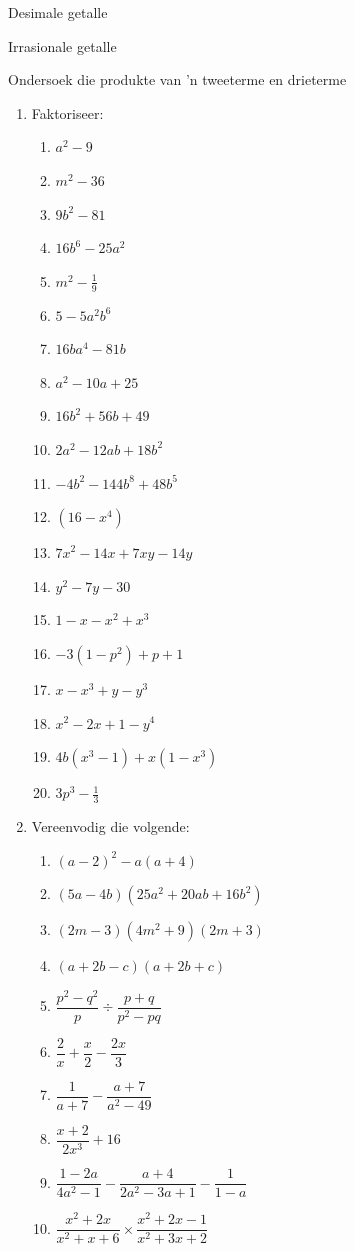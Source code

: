 \begin{Aktiwiteit}{Desimale getalle}
\begin{aktiwiteit}{Irrasionale getalle}
\begin{aktiwiteit}{Ondersoek die produkte van 'n tweeterme en drieterme}
\begin{eocexercises}{}
\begin{enumerate}[itemsep=5pt, label=\textbf{\arabic*}. ]
\item Faktoriseer:
\begin{multicols}{2}
\begin{enumerate}[itemsep=5pt, label=\textbf{\alph*}. ] 
\item ${a}^{2}-9$
\item ${m}^{2}-36$
\item $9{b}^{2}-81$
\item $16{b}^{6}-25{a}^{2}$
\item ${m}^{2}-\frac{1}{9}$
\item $5-5{a}^{2}{b}^{6}$
\item $16b{a}^{4}-81b$
\item ${a}^{2}-10a+25$
\item $16{b}^{2}+56b+49$
\item $2{a}^{2}-12ab+18{b}^{2}$
\item $-4{b}^{2}-144{b}^{8}+48{b}^{5}$
\item $(16-{x}^{4})$
\item ${7x}^{2}-14x+7xy-14y$
\item ${y}^{2}-7y-30$
\item $1-x-{x}^{2}+{x}^{3}$
\item $-3(1-{p}^{2})+p+1$
\item $x-x^{3} + y - y^{3}$
\item $x^{2} - 2x + 1 - y^{4}$
\item $4b(x^{3} - 1) + x(1-x^{3})$
\item $3p^{3} - \frac{1}{3}$
\end{enumerate}
\end{multicols}


\item Vereenvodig die volgende:
\begin{multicols}{2}
\begin{enumerate}[itemsep=5pt, label=\textbf{\alph*}. ] 

\item ${(a-2)}^{2}-a(a+4)$
\item $(5a-4b)(25{a}^{2}+20ab+16{b}^{2})$
\item $(2m-3)(4{m}^{2}+9)(2m+3)$
\item $(a+2b-c)(a+2b+c)$
\item $\dfrac{{p}^{2}-{q}^{2}}{p}÷\dfrac{p+q}{{p}^{2}-pq}$
\item $\dfrac{2}{x}+\dfrac{x}{2}-\dfrac{2x}{3}$
\item $\dfrac{1}{a+7}-\dfrac{a+7}{a^{2}-49}$
\item $\dfrac{x+2}{2x^{3}} + 16$
\item $\dfrac{1-2a}{4a^{2} -1} - \dfrac{a+4}{2a^{2}-3a+1} - \dfrac{1}{1-a}$
\item $\dfrac{x^{2} + 2x}{x^{2}+ x + 6} \times \dfrac{x^{2} + 2x - 1}{x^{2} + 3x +2}$
\end{enumerate}
\end{multicols}



\end{enumerate}
\end{eocexercises}
\end{aktiwiteit}
\end{aktiwiteit}
\end{Aktiwiteit}
